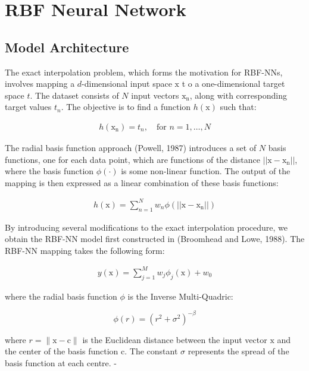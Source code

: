 \documentclass[12pt,a4paper]{article}
\begin{document}
\section{RBF Neural Network}

\subsection{Model Architecture}

The exact interpolation problem, which forms the motivation for RBF-NNs, 
involves mapping a $d$-dimensional input space $\boldsymbol{\mathrm{x}}$ t
o a one-dimensional target space $t$. The dataset consists of $N$ input
 vectors $\boldsymbol{\mathrm{x_n}}$, along with corresponding target 
 values $t_n$. The objective is to find a function
  $h(\boldsymbol{\mathrm{x}})$ such that:


\begin{align}
  h(\boldsymbol{\mathrm{x_n}}) = t_n, \quad \text{for } n = 1, \ldots, N
\end{align}

The radial basis function approach (Powell, 1987) 
introduces a set of $N$ basis functions, one for each 
data point, which are functions of the distance
$||\boldsymbol{\mathrm{x}} - \boldsymbol{\mathrm{x_n}}||$, where
the basis function $\phi(\cdot)$ is some non-linear function. The output of the mapping is then expressed as a linear combination of these basis functions:

\begin{align}
    h(\boldsymbol{\mathrm{x}}) = \sum_{n=1}^{N} w_n \phi(||\boldsymbol{\mathrm{x}} - \boldsymbol{\mathrm{x_n}}||)
\end{align}

By introducing several modifications to the exact interpolation 
procedure, we obtain the RBF-NN
model first constructed in (Broomhead and Lowe, 1988). 
The RBF-NN mapping takes the following form:

\begin{align}
    y(\boldsymbol{\mathrm{x}}) =  \sum_{j=1}^{M} w_{j} \phi_j(\boldsymbol{\mathrm{x}}) + w_{0}
\end{align}

where the radial basis function $\phi$ is the Inverse Multi-Quadric:

\[
\phi(r) = \left(r^2 + \sigma^2 \right)^{-\beta}
\]

where $r = \|\boldsymbol{\mathrm{x}} - \boldsymbol{\mathrm{c}}\|$ is the Euclidean distance between the input vector 
\(\boldsymbol{\mathrm{x}}\) and the center of the basis function 
\(\boldsymbol{\mathrm{c}}\). The constant $\sigma$ represents the
spread of the basis function at each centre.
- 
\end{document}
